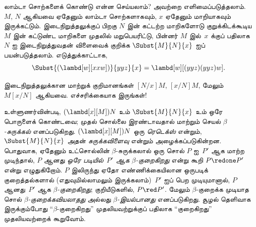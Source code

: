 \documentclass[../../../include/open-logic-section]{subfiles}
\begin{document}

லாம்டா சொற்களைக் கொண்டு என்ன செய்யலாம்? அவற்றை எளிமைப்படுத்தலாம். $M$, $N$
ஆகியவை ஏதேனும் லாம்டா சொற்களாகவும், $x$ ஏதேனும் மாறியாகவும் இருக்கட்டும்.
இடைநிறுத்தலுக்குப் பிறகு $N$ இன் கட்டற்ற மாறிகளோடு குறுக்கிடக்கூடிய $M$ இன்
கட்டுண்ட மாறிகளை முதலில் மறுபெயரிட்டு, பின்னர் $M$ இல்~$x$ க்குப் பதிலாக $N$
ஐ இடைநிறுத்துவதன் விளைவைக் குறிக்க $\Subst{M}{N}{x}$ ஐப் பயன்படுத்தலாம்.
எடுத்துக்காட்டாக,
\[
\Subst{(\lambd[w][xxw])}{yyz}{x} = \lambd[w][(yyz)(yyz)w].
\]

\begin{digress}
இடைநிறுத்தலுக்கான மாற்றுக் குறிமானங்கள் $[N/x]M$, $[x/N]M$, மேலும்
$M[x/N]$ ஆகியவை. எச்சரிக்கையாக இருங்கள்!
\end{digress}

உள்ளுணர்வின்படி, $(\lambd[x][M])N$ உம் $\Subst{M}{N}{x}$ உம் ஒரே பொருளைக்
கொண்டவை; முதல் சொல்லை இரண்டாவதால் மாற்றும் செயல் \emph{$\beta$-சுருக்கல்}
எனப்படுகிறது. $(\lambd[x][M])N$ ஒரு \emph{ரெடெக்ஸ்} என்றும்,
$\Subst{M}{N}{x}$ அதன் \emph{சுருக்கவிளைவு} என்றும் அழைக்கப்படுகின்றன.
பொதுவாக, ஏதேனும் உட்சொல்லின் $\beta$-சுருக்கலால் ஒரு சொல் $P$ ஐ~$P'$ ஆக
மாற்ற முடிந்தால், $P$ ஆனது \emph{ஒரே படியில்~$P'$ ஆக $\beta$-குறைகிறது}
என்று கூறி $P \redone P'$ என்று எழுதுகிறோம். $P$ இலிருந்து ஏதோ எண்ணிக்கையிலான
ஒருபடிக் குறைத்தல்களால் (எதுவுமில்லாமலும் இருக்கலாம்)~$P'$ ஐப் பெற முடியுமானால்,
$P$ ஆனது~$P'$ ஆக \emph{$\beta$-குறைகிறது}; குறியீடுகளில், $P \red P'$.
மேலும் $\beta$-குறைக்க முடியாத சொல் \emph{$\beta$-குறைக்கவியலாதது} அல்லது
\emph{$\beta$-இயல்பானது} எனப்படுகிறது. சூழல் தெளிவாக இருக்கும்போது
``$\beta$-குறைகிறது'' முதலியவற்றுக்குப் பதிலாக ``குறைகிறது'' முதலியவற்றைக்
கூறுவோம்.
\end{document}
